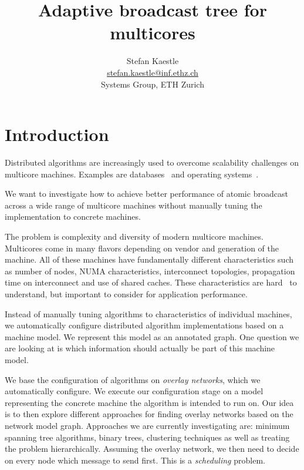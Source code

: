\documentclass{article}
\begin{document}
\title{Adaptive broadcast tree for multicores}

\newcommand{\eaddr}{stefan.kaestle@inf.ethz.ch}
\newcommand{\email}{\href{mailto:\eaddr}{\eaddr}}

\author{Stefan Kaestle\\
  \email \\
  Systems Group, ETH Zurich}

\maketitle


\section{Introduction}

Distributed algorithms are increasingly used to overcome scalability
challenges on multicore machines. Examples are
databases~\cite{Salomie2011, Wiesmann2000} and operating
systems~\cite{fos:osr09, tornado:osdi99, barrelfish:sosp09}.

We want to investigate how to achieve better performance of atomic
broadcast across a wide range of multicore machines without manually
tuning the implementation to concrete machines.

The problem is complexity and diversity of modern multicore
machines. Multicores come in many flavors depending on vendor and
generation of the machine. All of these machines have fundamentally
different characteristics such as number of nodes, NUMA
characteristics, interconnect topologies, propagation time on
interconnect and use of shared caches. These characteristics are hard~\cite{Cavage2013}
to understand, but important to consider for application performance. 

Instead of manually tuning algorithms to characteristics of individual
machines, we automatically configure distributed algorithm
implementations based on a machine model. We represent this model as an
annotated graph. One question we are looking at is which information
should actually be part of this machine model.

We base the configuration of algorithms on \emph{overlay networks}, which we
automatically configure. We execute our configuration stage on a model
representing the concrete machine the algorithm is intended to run
on. %
Our idea is to then explore different approaches for finding overlay
networks based on the network model graph. Approaches we are currently
investigating are: minimum spanning tree algorithms, binary trees,
clustering techniques as well as treating the problem
hierarchically. Assuming the overlay network, we then need to decide
on every node which message to send first. This is a \emph{scheduling}
problem.
\end{document}
